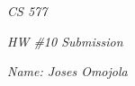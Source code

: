 \documentclass[12pt]{report}
\begin{document}
\centerline{\it CS 577}
\centerline{\it HW \#10 Submission}
\centerline{\it Name: Joses Omojola}

\end{document}
